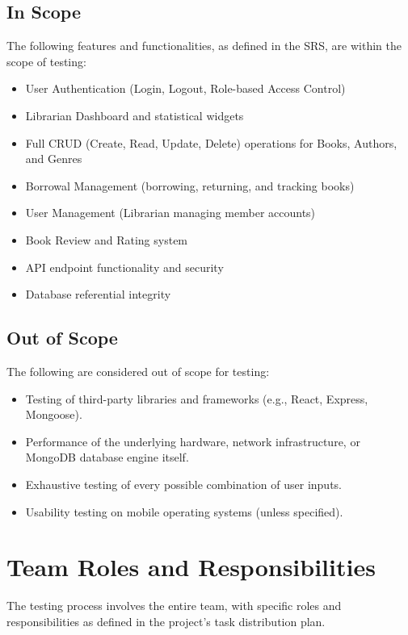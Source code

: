 \subsection{In Scope}
The following features and functionalities, as defined in the SRS, are within the scope of testing:
\begin{itemize}
    \item User Authentication (Login, Logout, Role-based Access Control)
    \item Librarian Dashboard and statistical widgets
    \item Full CRUD (Create, Read, Update, Delete) operations for Books, Authors, and Genres
    \item Borrowal Management (borrowing, returning, and tracking books)
    \item User Management (Librarian managing member accounts)
    \item Book Review and Rating system
    \item API endpoint functionality and security
    \item Database referential integrity
\end{itemize}

\subsection{Out of Scope}
The following are considered out of scope for testing:
\begin{itemize}
    \item Testing of third-party libraries and frameworks (e.g., React, Express, Mongoose).
    \item Performance of the underlying hardware, network infrastructure, or MongoDB database engine itself.
    \item Exhaustive testing of every possible combination of user inputs.
    \item Usability testing on mobile operating systems (unless specified).
\end{itemize}

\section{Team Roles and Responsibilities}
The testing process involves the entire team, with specific roles and responsibilities as defined in the project's task distribution plan.

